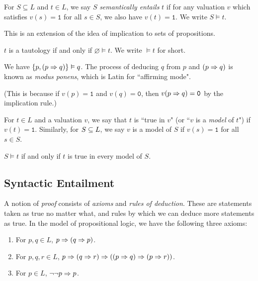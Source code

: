 \documentclass{article}
\begin{document}
\begin{definition}
    For $S \subseteq L$ and $t \in L$, we say $S$ \textit{semantically entails} $t$ if for any valuation $v$ which satisfies $v(s) = \texttt{1}$ for all $s \in S$, we also have $v(t) = \texttt{1}$. We write $S \vDash t$.
    
    This is an extension of the idea of implication to sets of propositions.
\end{definition}

\begin{corollary}
    $t$ is a tautology if and only if $\varnothing \vDash t$. We write $\vDash t$ for short.
\end{corollary}

\begin{example}
    We have $\left\lbrace p, (p \Rightarrow q) \right\rbrace \vDash q$. The process of deducing $q$ from $p$ and $(p \Rightarrow q)$ is known as \textit{modus ponens}, which is Latin for ``affirming mode".
    
    (This is because if $v(p) = \texttt{1}$ and $v(q) = \texttt{0}$, then $v(p \Rightarrow q) = \texttt{0}$ by the implication rule.)
\end{example}

\begin{definition}[Model]
	\label{model}
    For $t \in L$ and a valuation $v$, we say that $t$ is ``true in $v$" (or ``$v$ is a \textit{model} of $t$") if $v(t) = \texttt{1}$. Similarly, for $S \subseteq L$, we say $v$ is a model of $S$ if $v(s) = \texttt{1}$ for all $s \in S$.
\end{definition}

\begin{corollary}
    $S \vDash t$ if and only if $t$ is true in every model of $S$.
\end{corollary}


\subsection{Syntactic Entailment}
\label{section-syntactic-entailment}

A notion of \textit{proof} consists of \textit{axioms} and \textit{rules of deduction}. These are statements taken as true no matter what, and rules by which we can deduce more statements as true. In the model of propositional logic, we have the following three axioms:
\begin{enumerate}
    \item For $p, q \in L$, $p \Rightarrow (q \Rightarrow p)$.
    \item For $p, q, r \in L$, $p \Rightarrow (q \Rightarrow r) \Rightarrow ((p \Rightarrow q) \Rightarrow (p \Rightarrow r))$.
    \item For $p \in L$, $\lnot \lnot p \Rightarrow p$.
\end{enumerate}
\end{document}
